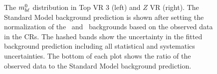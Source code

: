 \begin{figure}
  \centering
  \caption{The $m_{b\ell}^0$ distribution in Top VR 3 (left) and $Z$ VR (right).
    The Standard Model background prediction is shown after setting the
    normalization of the \TTBAR\ and \ZGAMMAJETS\ backgrounds based on the
    observed data in the CRs. The hashed bands show the uncertainty in the
    fitted background prediction including all statistical and systematics
    uncertainties.
    The bottom of each plot shows the ratio of the observed data to the
    Standard Model background prediction.
  }
  \label{fig:mbl_vr}
\end{figure}

